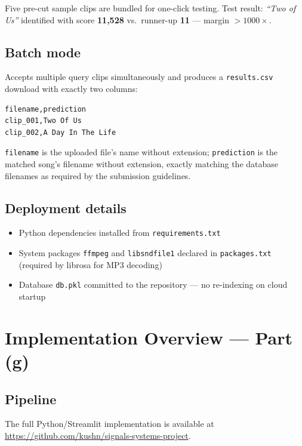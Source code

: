 \documentclass[11pt,a4paper]{article}
\begin{document}
Five pre-cut sample clips are bundled for one-click testing.
Test result: \textit{``Two of Us''} identified with score \textbf{11{,}528}
vs.\ runner-up \textbf{11} — margin $>1000\times$.

\subsection{Batch mode}

Accepts multiple query clips simultaneously and produces a
\texttt{results.csv} download with exactly two columns:

\begin{lstlisting}
filename,prediction
clip_001,Two Of Us
clip_002,A Day In The Life
\end{lstlisting}

\texttt{filename} is the uploaded file's name without extension;
\texttt{prediction} is the matched song's filename without extension, exactly
matching the database filenames as required by the submission guidelines.

\subsection{Deployment details}

\begin{itemize}[noitemsep]
  \item Python dependencies installed from \texttt{requirements.txt}
  \item System packages \texttt{ffmpeg} and \texttt{libsndfile1} declared in
        \texttt{packages.txt} (required by librosa for MP3 decoding)
  \item Database \texttt{db.pkl} committed to the repository — no re-indexing
        on cloud startup
\end{itemize}

\section{Implementation Overview — Part (g)}

\subsection{Pipeline}

The full Python/Streamlit implementation is available at
\url{https://github.com/kushn/signals-systems-project}.
\end{document}
